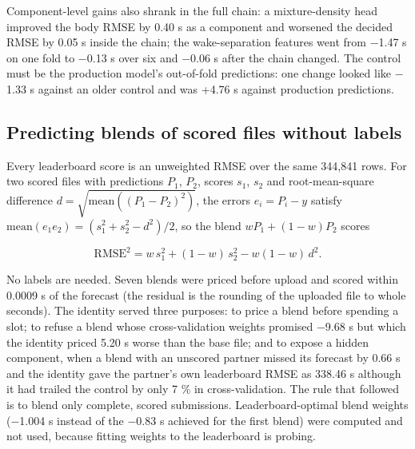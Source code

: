 \documentclass[11pt,a4paper]{article}
\begin{document}
Component-level gains also shrank in the full chain: a mixture-density head improved the body RMSE by 0.40 s as a component and worsened the decided RMSE by 0.05 s inside the chain; the wake-separation features went from $-$1.47 s on one fold to $-$0.13 s over six and $-$0.06 s after the chain changed. The control must be the production model's out-of-fold predictions: one change looked like $-$1.33 s against an older control and was +4.76 s against production predictions.

\subsection{Predicting blends of scored files without labels}\label{predicting-blends-of-scored-files-without-labels}

Every leaderboard score is an unweighted RMSE over the same 344,841 rows. For two scored files with predictions \(P_1\), \(P_2\), scores \(s_1\), \(s_2\) and root-mean-square difference \(d = \sqrt{\mathrm{mean}((P_1 - P_2)^2)}\), the errors \(e_i = P_i - y\) satisfy \(\mathrm{mean}(e_1 e_2) = (s_1^2 + s_2^2 - d^2)/2\), so the blend \(wP_1 + (1-w)P_2\) scores

\begin{equation}\mathrm{RMSE}^2 = w\,s_1^2 + (1-w)\,s_2^2 - w(1-w)\,d^2 .\end{equation}

No labels are needed. Seven blends were priced before upload and scored within 0.0009 s of the forecast (the residual is the rounding of the uploaded file to whole seconds). The identity served three purposes: to price a blend before spending a slot; to refuse a blend whose cross-validation weights promised $-$9.68 s but which the identity priced 5.20 s worse than the base file; and to expose a hidden component, when a blend with an unscored partner missed its forecast by 0.66 s and the identity gave the partner's own leaderboard RMSE as 338.46 s although it had trailed the control by only 7 \% in cross-validation. The rule that followed is to blend only complete, scored submissions. Leaderboard-optimal blend weights ($-$1.004 s instead of the $-$0.83 s achieved for the first blend) were computed and not used, because fitting weights to the leaderboard is probing.
\end{document}
